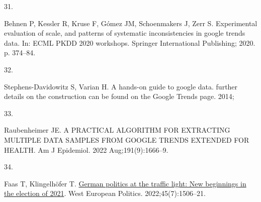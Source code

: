 \documentclass[
  letterpaper,
  DIV=11,
  numbers=noendperiod]{scrartcl}
\newlength{\cslhangindent}
\newlength{\csllabelwidth}
\newlength{\cslentryspacingunit} %
\newenvironment{CSLReferences}[2] %
 {%
  \setlength{\parindent}{0pt}
  \ifodd #1
  \let\oldpar\par
  \def\par{\hangindent=\cslhangindent\oldpar}
  \fi
  \setlength{\parskip}{#2\cslentryspacingunit}
 }%
 {}
\newcommand{\CSLLeftMargin}[1]{\parbox[t]{\csllabelwidth}{#1}}
\newcommand{\CSLRightInline}[1]{\parbox[t]{\linewidth - \csllabelwidth}{#1}\break}
\begin{document}
\begin{CSLReferences}{0}{0}
\leavevmode{}%
\CSLLeftMargin{31. }%
\CSLRightInline{Behnen P, Kessler R, Kruse F, Gómez JM, Schoenmakers J,
Zerr S. Experimental evaluation of scale, and patterns of systematic
inconsistencies in google trends data. In: {ECML} {PKDD} 2020 workshops.
Springer International Publishing; 2020. p. 374--84. }

\leavevmode{}%
\CSLLeftMargin{32. }%
\CSLRightInline{Stephens-Davidowitz S, Varian H. A hands-on guide to
google data. further details on the construction can be found on the
Google Trends page. 2014; }

\leavevmode{}%
\CSLLeftMargin{33. }%
\CSLRightInline{Raubenheimer JE. A {PRACTICAL} {ALGORITHM} {FOR}
{EXTRACTING} {MULTIPLE} {DATA} {SAMPLES} {FROM} {GOOGLE} {TRENDS}
{EXTENDED} {FOR} {HEALTH}. Am J Epidemiol. 2022 Aug;191(9):1666--9. }

\leavevmode{}%
\CSLLeftMargin{34. }%
\CSLRightInline{Faas T, Klingelhöfer T.
\href{https://doi.org/10.1080/01402382.2022.2045783}{German politics at
the traffic light: New beginnings in the election of 2021}. West
European Politics. 2022;45(7):1506--21. }

\end{CSLReferences}
\end{document}
